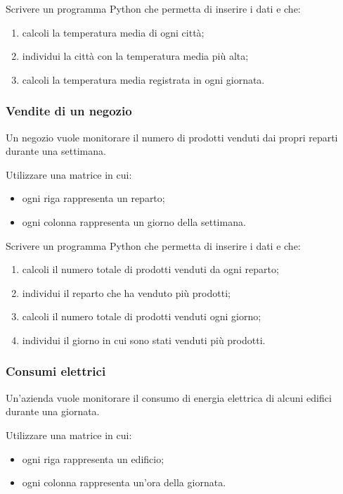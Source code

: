 \documentclass[a4paper,12pt]{article}
\begin{document}
	Scrivere un programma Python che permetta di inserire i dati e che:
	
	\begin{enumerate}
		\item calcoli la temperatura media di ogni città;
		\item individui la città con la temperatura media più alta;
		\item calcoli la temperatura media registrata in ogni giornata.
	\end{enumerate}
	
	\subsubsection{Vendite di un negozio}
	Un negozio vuole monitorare il numero di prodotti venduti dai propri reparti durante una settimana.
	
	Utilizzare una matrice in cui:
	\begin{itemize}
		\item ogni riga rappresenta un reparto;
		\item ogni colonna rappresenta un giorno della settimana.
	\end{itemize}
	
	Scrivere un programma Python che permetta di inserire i dati e che:
	
	\begin{enumerate}
		\item calcoli il numero totale di prodotti venduti da ogni reparto;
		\item individui il reparto che ha venduto più prodotti;
		\item calcoli il numero totale di prodotti venduti ogni giorno;
		\item individui il giorno in cui sono stati venduti più prodotti.
	\end{enumerate}
	
	\subsubsection{Consumi elettrici}
	
	Un'azienda vuole monitorare il consumo di energia elettrica di alcuni edifici durante una giornata.
	
	Utilizzare una matrice in cui:
	\begin{itemize}
		\item ogni riga rappresenta un edificio;
		\item ogni colonna rappresenta un'ora della giornata.
	\end{itemize}
	
\end{document}
